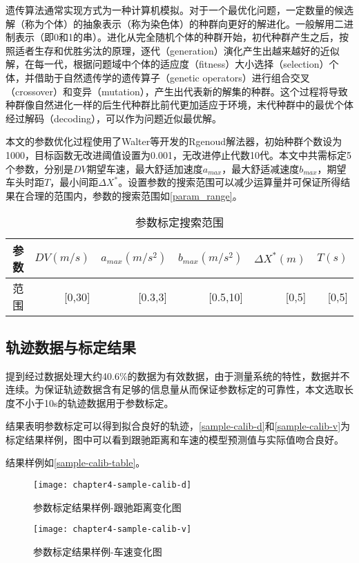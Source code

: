 遗传算法通常实现方式为一种计算机模拟。对于一个最优化问题，一定数量的候选解（称为个体）的抽象表示（称为染色体）的种群向更好的解进化。一般解用二进制表示（即0和1的串）。进化从完全随机个体的种群开始，初代种群产生之后，按照适者生存和优胜劣汰的原理，逐代（generation）演化产生出越来越好的近似解，在每一代，根据问题域中个体的适应度（fitness）大小选择（selection）个体，并借助于自然遗传学的遗传算子（genetic operators）进行组合交叉（crossover）和变异（mutation），产生出代表新的解集的种群。这个过程将导致种群像自然进化一样的后生代种群比前代更加适应于环境，末代种群中的最优个体经过解码（decoding），可以作为问题近似最优解。


本文的参数优化过程使用了Walter等\cite{WRMebane2009}开发的Rgenoud解法器，初始种群个数设为1000，目标函数无改进阈值设置为0.001，无改进停止代数10代。本文中共需标定5个参数，分别是$DV$期望车速，最大舒适加速度$a_{max}$，最大舒适减速度$b_{max}$，期望车头时距$T$，最小间距$\Delta X^*$。设置参数的搜索范围可以减少运算量并可保证所得结果在合理的范围内，参数的搜索范围如\autoref{param_range}。


\begin{table}[htbp]
  \centering
  \caption{参数标定搜索范围}
    \begin{tabular}{rrrrrr}
    \addlinespace
    \toprule
    参数    & $DV(m/s)$    & $a_{max}(m/s^2)$    & $b_{max}(m/s^2)$    &  $\Delta X^*(m)$    & $T(s)$ \\
    \midrule
    范围    & [0,30] & [0.3,3] & [0.5,10] & [0,5] & [0,5] \\
    \bottomrule
    \end{tabular}%
  \label{param_range}%
\end{table}%


\subsection{轨迹数据与标定结果}
提到经过数据处理大约40.6\%的数据为有效数据，由于测量系统的特性，数据并不连续。为保证轨迹数据含有足够的信息量从而保证参数标定的可靠性，本文选取长度不小于10s的轨迹数据用于参数标定。

结果表明参数标定可以得到拟合良好的轨迹，\autoref{sample-calib-d}和\autoref{sample-calib-v}为标定结果样例，图中可以看到跟驰距离和车速的模型预测值与实际值吻合良好。

结果样例如\autoref{sample-calib-table}。

\begin{figure}[htbp]
\begin{minipage}[t]{0.48\linewidth}
\centering
\texttt{[image: chapter4-sample-calib-d]}
\caption{参数标定结果样例-跟驰距离变化图}
\label{sample-calib-d}
\end{minipage}%
\hspace*{0.04\linewidth}
\begin{minipage}[t]{0.48\linewidth}
\centering
\texttt{[image: chapter4-sample-calib-v]}
\caption{参数标定结果样例-车速变化图}
\label{sample-calib-v}
\end{minipage}
\end{figure}

